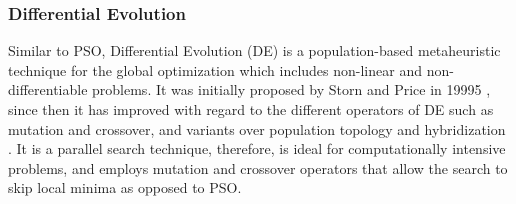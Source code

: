 
\subsubsection{Differential Evolution}
Similar to PSO, Differential Evolution (DE) is a population-based metaheuristic technique for the global optimization which includes non-linear and non-differentiable problems. It was initially proposed by Storn and Price in 19995 \cite{Storn1997DifferentialSpaces}, since then it has improved with regard to the different operators of DE such as mutation and crossover, and variants over population topology and hybridization \cite{Das2016RecentSurvey}. It is a parallel search technique, therefore, is ideal for computationally intensive problems, and employs mutation and crossover operators that allow the search to skip local minima as opposed to PSO.

